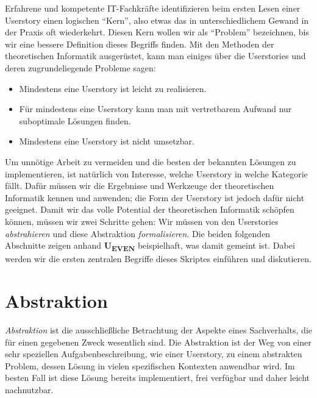Erfahrene und kompetente IT-Fachkräfte identifizieren beim ersten Lesen einer Userstory
einen logischen ``Kern'',
also etwas das in unterschiedlichem Gewand in der Praxis oft wiederkehrt.
Diesen Kern wollen wir als ``Problem'' bezeichnen,
bis wir eine bessere Definition dieses Begriffs finden.
Mit den Methoden der theoretischen Informatik ausgerüstet,
kann man einiges über die Userstories und deren zugrundeliegende Probleme sagen:
\begin{itemize}
    \item Mindestens eine Userstory ist leicht zu realisieren.
    \item Für mindestens eine Userstory kann man mit vertretbarem Aufwand nur suboptimale Lösungen finden.
    \item Mindestens eine Userstory ist nicht umsetzbar.
\end{itemize}
Um unnötige Arbeit zu vermeiden
und die besten der bekannten Lösungen zu implementieren,
ist natürlich von Interesse,
welche Userstory in welche Kategorie fällt.
Dafür müssen wir die Ergebnisse und Werkzeuge
der theoretischen Informatik kennen und anwenden;
die Form der Userstory ist jedoch dafür nicht geeignet.
Damit wir das volle Potential der theoretischen Informatik schöpfen können,
müssen wir zwei Schritte gehen:
Wir müssen von den Userstories \emph{abstrahieren}
und diese Abstraktion \emph{formalisieren}.
Die beiden folgenden Abschnitte zeigen anhand \textbf{U\textsubscript{EVEN}}
beispielhaft, was damit gemeint ist.
Dabei werden wir die ersten zentralen Begriffe dieses Skriptes einführen und diskutieren.
\section{Abstraktion}

\emph{Abstraktion} ist die ausschließliche Betrachtung der Aspekte eines Sachverhalts,
die für einen gegebenen Zweck wesentlich sind.
Die Abstraktion ist der Weg von einer sehr speziellen Aufgabenbeschreibung,
wie einer Userstory, zu einem abstrakten Problem,
dessen Lösung in vielen spezifischen Kontexten anwendbar wird.
Im besten Fall ist diese Lösung bereits implementiert, frei verfügbar 
und daher leicht nachnutzbar.

